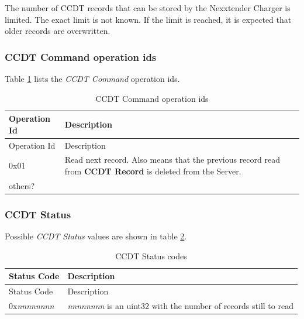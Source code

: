 \documentclass[a4paper]{article}
\begin{document}
The number of CCDT records that can be stored by the Nexxtender Charger is limited. 
The exact limit is not known. 
If the limit is reached, it is expected that older records are overwritten.

\subsubsection{CCDT Command operation ids}
\label{ccdt_command_operation_ids}

Table \ref{table.57} lists the \emph{CCDT Command} operation
id\textquotesingle s.

\begin{longtable}[]{@{}lp{14cm}@{}}
	\caption{CCDT Command operation ids}
	\label{table.57}
	\tabularnewline
	\toprule\noalign{}
	Operation Id & Description                                                    \\
	\midrule\noalign{}
	\endfirsthead
	\toprule\noalign{}
	Operation Id & Description                                                    \\
	\midrule\noalign{}
	\endhead
	\bottomrule\noalign{}
	\endlastfoot
	0x01         & Read next record. Also means that the previous record 
	read from \textbf{CCDT Record} is deleted from the Server. \\
	others?      &                                                                \\
\end{longtable}

\subsubsection{CCDT Status}
\label{ccdt_status_status}

Possible \emph{CCDT Status} values are shown in table \ref{table.58}.

\begin{longtable}[]{@{}ll@{}}
	\caption{CCDT Status codes}
	\label{table.58}
	\tabularnewline
	\toprule\noalign{}
	Status Code       & Description                                     \\
	\midrule\noalign{}
	\endfirsthead
	\toprule\noalign{}
	Status Code       & Description                                     \\
	\midrule\noalign{}
	\endhead
	\bottomrule\noalign{}
	\endlastfoot
	0x\emph{nnnnnnnn} & \emph{nnnnnnnn} is an uint32 with the number of 
	records still to read \\
\end{longtable}
\end{document}
